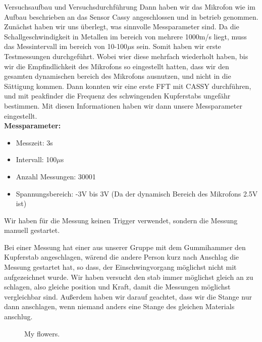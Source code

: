 \documentclass[twoside]{protokoll}
\begin{document}
\begin{aufgabe}{Versuchsaufbau und Versuchsdurchführung}
Dann haben wir das Mikrofon wie im Aufbau beschrieben an das Sensor Cassy angeschlossen und in betrieb genommen. Zunächst haben wir uns überlegt, was sinnvolle Messparameter sind. Da die Schallgeschwindigkeit in Metallen im bereich von mehrere 1000m/s liegt, muss das Messintervall im bereich von 10-100$\mu$s sein. Somit haben wir erste Testmessungen durchgeführt. Wobei wier diese mehrfach wiederholt haben, bis wir die Empfindlichkeit des Mikrofons so eingestellt hatten, dass wir den gesamten dynamischen bereich des Mikrofons ausnutzen, und nicht in die Sättigung kommen. Dann konnten wir eine erste FFT mit CASSY durchführen, und mit peakfinder die Frequenz des schwingenden Kupferstabs ungefähr bestimmen. Mit diesen Informationen haben wir dann unsere Messparameter eingestellt.\\

\textbf{Messparameter:}
\begin{itemize}
\item Messzeit: 3s
\item Intervall: 100$\mu$s
\item Anzahl Messungen: 30001
\item Spannungsbereich: -3V bis 3V (Da der dynamisch Bereich des Mikrofons 2.5V ist)
\end{itemize}

Wir haben für die Messung keinen Trigger verwendet, sondern die Messung manuell gestartet. 


Bei einer Messung hat einer aus unserer Gruppe mit dem Gummihammer den Kupferstab angeschlagen, wärend die andere Person kurz nach Anschlag die Messung gestartet hat, so dass, der Einschwingvorgang möglichst nicht mit aufgezeichnet wurde. Wir haben versucht den stab immer möglichst gleich an zu schlagen, also gleiche position und Kraft, damit die Messungen möglichst vergleichbar sind. Außerdem haben wir darauf geachtet, dass wir die Stange nur dann anschlagen, wenn niemand anders eine Stange des gleichen Materials anschlug.

\begin{figure}[!tbp]
  \centering
  \hfill
  \caption{My flowers.}
\end{figure}




\end{aufgabe}
\end{document}
